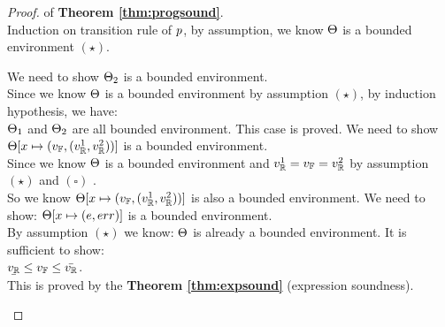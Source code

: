 \documentclass[a4paper,11pt]{article}
\begin{document}
\begin{proof} of \textbf{Theorem \ref{thm:progsound}}.
%
\\
%
Induction on transition rule of $p$, by assumption, we know $\Theta$ is a bounded environment $(\star)$.
\begin{itemize}
	We need to show $\Theta_2$ is a bounded environment.\\
	Since we know $\Theta$ is a bounded environment by assumption $(\star)$, by induction hypothesis, we have:
	\\
	$\Theta_1$ and $\Theta_2$ are all bounded environment. This case is proved.
%
	\caseL{\[
	\inferrule*[right = sample]
	{
		 \fval \leftarrow \edistr^{\diamond}
		 \and
	 	\rval^1 = \fval = \rval^2 ~ (\square)
	}
	{
		\trsenv, \varx \samplel \edistr
		\trsto
		\trsenv[\varx \mapsto (\fval, (\rval^1, \rval^2))]
	}
	\]}
	We need to show $\Theta[x \mapsto (v_{\mathbb{F}}, (v_{\mathbb{R}}^1, v_{\mathbb{R}}^2))]$ is a bounded environment.\\
	Since we know $\Theta$ is a bounded environment and $v_{\mathbb{R}}^1 = v_{\mathbb{F}} =v_{\mathbb{R}}^2$ by assumption $(\star)$ and $(\square)$ .
	\\
	So we know $\Theta[x \mapsto (v_{\mathbb{F}}, (v_{\mathbb{R}}^1, v_{\mathbb{R}}^2))]$ is also a bounded environment.
%
	\caseL{\[
	\inferrule*[right = asg]
	{
		\trsenv, \expr \trsto (\fval, (\ubar{\rval}, \bar{\rval}) )
	}
	{
		\trsenv, \varx = \expr
		\trsto
		\trsenv[\varx \mapsto (\fval, (\ubar{\rval}, \bar{\rval}) )]
	}
	\]}
	We need to show: $\Theta[x \mapsto (e, err )]$ is a bounded environment.\\
	By assumption $(\star)$ we know: $\Theta$ is already a bounded environment. It is sufficient to show:\\
	$\ubar{\rval} \leq \fval \leq \bar{\rval}$.\\
	This is proved by the \textbf{Theorem \ref{thm:expsound}} (expression soundness).
\end{itemize}
\end{proof}
%
%
\end{document}
